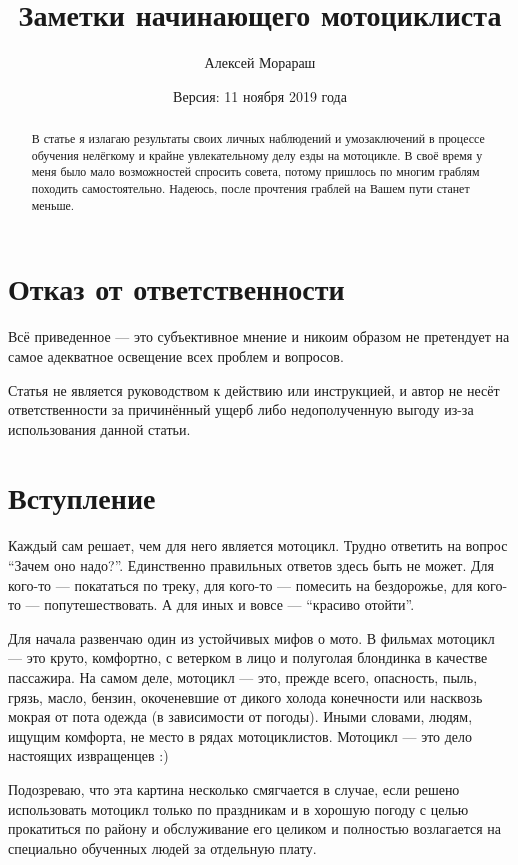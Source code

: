 \documentclass[12pt,a4paper]{article}
\title{Заметки начинающего мотоциклиста}
\author{Алексей Морараш}
\date{Версия: 11 ноября 2019 года}
\begin{document}
\maketitle

\renewcommand{\contentsname}{Содержание}

\tableofcontents

\clearpage

\begin{abstract}
В статье я излагаю результаты своих личных наблюдений и умозаключений
в процессе обучения нелёгкому и крайне увлекательному делу езды на
мотоцикле. В своё время у меня было мало возможностей спросить совета,
потому пришлось по многим граблям походить самостоятельно. Надеюсь,
после прочтения граблей на Вашем пути станет меньше.
\end{abstract}

\section{Отказ от ответственности}

Всё приведенное --- это субъективное мнение и никоим образом не
претендует на самое адекватное освещение всех проблем и вопросов.

Статья не является руководством к действию или инструкцией,
и автор не несёт ответственности за причинённый ущерб либо
недополученную выгоду из-за использования данной статьи.

\section{Вступление}

Каждый сам решает, чем для него является мотоцикл. Трудно ответить
на вопрос ``Зачем оно надо?''. Единственно правильных ответов
здесь быть не может. Для кого-то --- покататься по треку, для кого-то ---
помесить на бездорожье, для кого-то --- попутешествовать. А для иных и
вовсе --- ``красиво отойти''.

Для начала развенчаю один из устойчивых мифов о мото. В фильмах
мотоцикл --- это круто, комфортно, с ветерком в лицо и полуголая
блондинка в качестве пассажира. На самом деле, мотоцикл --- это,
прежде всего, опасность, пыль, грязь, масло, бензин, окоченевшие
от дикого холода конечности или насквозь мокрая от пота одежда
(в зависимости от погоды). Иными словами, людям, ищущим комфорта,
не место в рядах мотоциклистов. Мотоцикл --- это дело настоящих
извращенцев :)

Подозреваю, что эта картина несколько смягчается в случае, если
решено использовать мотоцикл только по праздникам и в хорошую погоду
с целью прокатиться по району и обслуживание его целиком и полностью
возлагается на специально обученных людей за отдельную плату.
\end{document}
